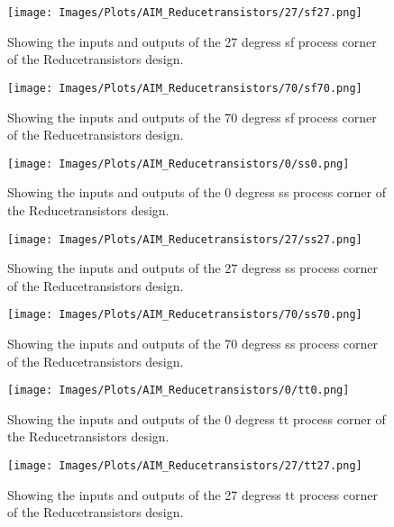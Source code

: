 \newline
\begin{figure}[htb] 
    \centering
    \texttt{[image: Images/Plots/AIM\_Reducetransistors/27/sf27.png]} 
    \caption{Showing the inputs and outputs of the 27 degress sf process corner of the Reducetransistors design.} 
    \label{fig:27sfReducetransistors} 
\end{figure}
\begin{figure}[htb] 
    \centering
    \texttt{[image: Images/Plots/AIM\_Reducetransistors/70/sf70.png]} 
    \caption{Showing the inputs and outputs of the 70 degress sf process corner of the Reducetransistors design.} 
    \label{fig:70sfReducetransistors} 
\end{figure}
\newline
\begin{figure}[htb] 
    \centering
    \texttt{[image: Images/Plots/AIM\_Reducetransistors/0/ss0.png]} 
    \caption{Showing the inputs and outputs of the 0 degress ss process corner of the Reducetransistors design.} 
    \label{fig:0ssReducetransistors} 
\end{figure}
\begin{figure}[htb] 
    \centering
    \texttt{[image: Images/Plots/AIM\_Reducetransistors/27/ss27.png]} 
    \caption{Showing the inputs and outputs of the 27 degress ss process corner of the Reducetransistors design.} 
    \label{fig:27ssReducetransistors} 
\end{figure}
\newline
\begin{figure}[htb] 
    \centering
    \texttt{[image: Images/Plots/AIM\_Reducetransistors/70/ss70.png]} 
    \caption{Showing the inputs and outputs of the 70 degress ss process corner of the Reducetransistors design.} 
    \label{fig:70ssReducetransistors} 
\end{figure}
\begin{figure}[htb] 
    \centering
    \texttt{[image: Images/Plots/AIM\_Reducetransistors/0/tt0.png]} 
    \caption{Showing the inputs and outputs of the 0 degress tt process corner of the Reducetransistors design.} 
    \label{fig:0ttReducetransistors} 
\end{figure}
\newline
\begin{figure}[htb] 
    \centering
    \texttt{[image: Images/Plots/AIM\_Reducetransistors/27/tt27.png]} 
    \caption{Showing the inputs and outputs of the 27 degress tt process corner of the Reducetransistors design.} 
    \label{fig:27ttReducetransistors} 
\end{figure}

